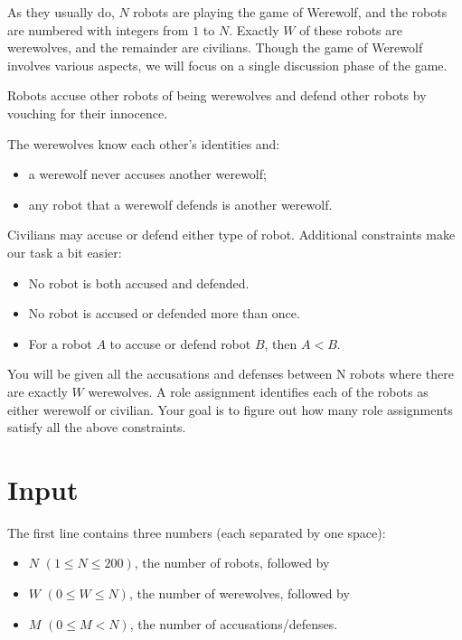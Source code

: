 As they usually do, $N$ robots are playing the game of Werewolf, and the robots are numbered with integers from $1$ to $N$. Exactly $W$ of these robots are werewolves, and the remainder are civilians. Though the game of Werewolf involves various aspects, we will focus on a single discussion phase of the game.

Robots accuse other robots of being werewolves and defend other robots by vouching for their innocence.

The werewolves know each other's identities and:

\begin{itemize}
\item a werewolf never accuses another werewolf;
\item any robot that a werewolf defends is another werewolf.
\end{itemize}

Civilians may accuse or defend either type of robot.
Additional constraints make our task a bit easier:

\begin{itemize}
\item No robot is both accused and defended.
\item No robot is accused or defended more than once.
\item For a robot $A$ to accuse or defend robot $B$, then $A < B$.
\end{itemize}

You will be given all the accusations and defenses between N robots where there are exactly $W$ werewolves. A role assignment identifies each of the robots as either werewolf or civilian. Your goal is to figure out how many role assignments satisfy all the above constraints.

\section*{Input}
The first line contains three numbers (each separated by one space):

\begin{itemize}
\item $N$ $(1 \leq N \leq 200)$, the number of robots, followed by
\item $W$ $(0 \leq W \leq N)$, the number of werewolves, followed by
\item $M$ $(0 \leq M < N)$, the number of accusations/defenses.
\end{itemize}

